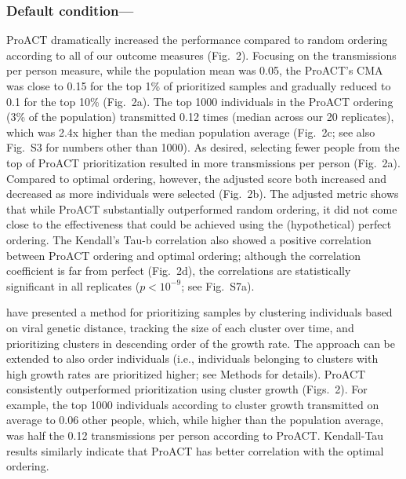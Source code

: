 \documentclass[oupdraft]{sysbio}
\newcommand{\TODO}[1]{{\color{red} #1} }
\newcommand{\PLWH}{sample\xspace}
\begin{document}
\subsubsection{Default condition---}
ProACT dramatically increased the performance compared to random ordering according to all of our outcome measures (Fig.~2).
Focusing on the transmissions per person measure, while the population mean was 0.05, the ProACT's CMA was close to 0.15 for the top 1\% of prioritized \PLWH{s} and gradually reduced to 0.1 for the top 10\% (Fig.~2a).
The top 1000 individuals in the ProACT ordering (3\% of the population)  transmitted {0.12} times (median across our 20 replicates), which was 2.4x  higher than the median population average (Fig.~2c; see also Fig.~S3 for numbers other than 1000).
As desired, selecting fewer people from the top of ProACT prioritization resulted in more transmissions per person (Fig.~2a).
Compared to optimal ordering, however, the adjusted score both increased and decreased as more individuals were selected (Fig.~2b). 
The adjusted metric shows that while ProACT substantially outperformed random ordering, it did not come close to the effectiveness that could be achieved using the (hypothetical) perfect ordering. 
The Kendall's Tau-b correlation also showed a positive correlation between ProACT ordering and optimal ordering;  although the correlation coefficient is far from perfect (Fig.~2d), the correlations are statistically significant in all replicates ($p<10^{-9}$; see Fig.~S7a).




\citet{Wertheim2018} have presented a method for prioritizing \PLWH{s} by clustering individuals based on viral genetic distance, tracking the size of each cluster over time, and prioritizing clusters in descending order of the growth rate. The approach can be extended to also order individuals (i.e., individuals belonging to clusters with high growth rates are prioritized higher; see Methods for details).
ProACT consistently outperformed prioritization using cluster growth  (Figs.~2).
For example, the top 1000 individuals according to cluster growth transmitted on average to 0.06 other people, which, while higher than the population average, was half the 0.12 transmissions per person according to ProACT. 
Kendall-Tau results similarly indicate that ProACT has better correlation with the optimal ordering.
\end{document}
